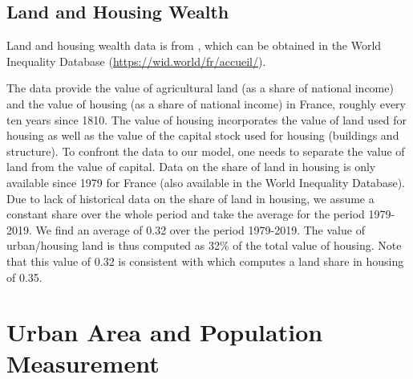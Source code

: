 \documentclass[11pt]{report}
\begin{document}
\subsection{Land and Housing Wealth}\label{A-sec:wealth}
Land and housing wealth data is from \cite{piketty2014capital}, which can be obtained in the World Inequality Database (\url{https://wid.world/fr/accueil/}). 

The data provide the value of agricultural land (as a share of national income) and the value of housing (as a share of national income) in France, roughly every ten years since 1810. The value of housing incorporates the value of land used for housing as well as the value of the capital stock used for housing (buildings and structure). To confront the data to our model, one needs to separate the value of land from the value of capital. Data on the share of land in housing is only available since 1979 for France (also available in the World Inequality Database). Due to lack of historical data on the share of land in housing, we assume a constant share over the whole period and take the average for the period 1979-2019. We find an average of 0.32 over the period 1979-2019. The value of urban/housing land is thus computed as 32\% of the total value of housing. Note that this value of 0.32 is consistent with \cite{combesetal2021} which computes a land share in housing of 0.35.

\pagebreak
\section{Urban Area and Population Measurement}\label{A-sec:area-pop-measure}
\end{document}
